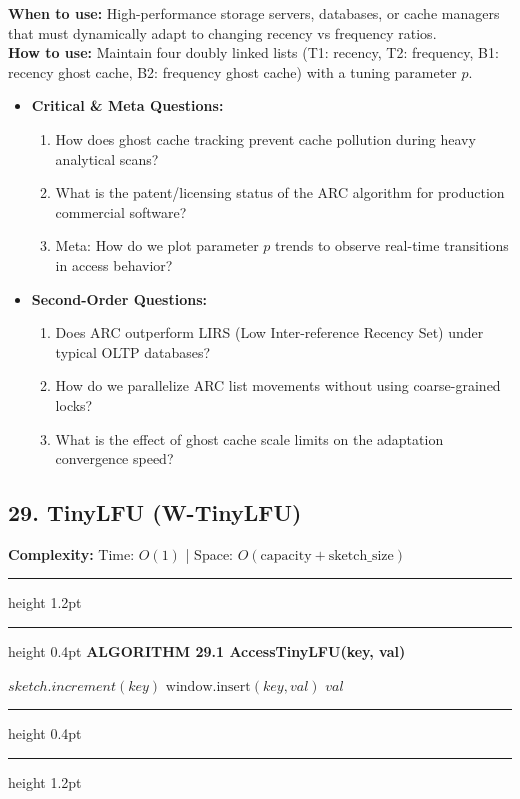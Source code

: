 \documentclass[11pt,a4paper]{article}
\newenvironment{textbookalgo}[2]{%
  \par\addvspace{1.2em}\noindent
  \hrule height 1.2pt
  \vspace{1.5pt}
  \hrule height 0.4pt
  \vspace{5pt}
  {\noindent\large\bfseries\sffamily ALGORITHM #1 \quad #2}
  \par\vspace{5pt}
  \RestyleAlgo{plain}
}{%
  \par\vspace{4pt}
  \hrule height 0.4pt
  \vspace{1.5pt}
  \hrule height 1.2pt
  \par\addvspace{1.2em}
}
\theoremstyle{definition}
\begin{document}
\noindent
\textbf{When to use:} High-performance storage servers, databases, or cache managers that must dynamically adapt to changing recency vs frequency ratios.\\
\textbf{How to use:} Maintain four doubly linked lists (T1: recency, T2: frequency, B1: recency ghost cache, B2: frequency ghost cache) with a tuning parameter $p$.
\begin{itemize}[leftmargin=*]
  \item[] \textbf{Critical \& Meta Questions:}
  \begin{enumerate}
    \item How does ghost cache tracking prevent cache pollution during heavy analytical scans?
    \item What is the patent/licensing status of the ARC algorithm for production commercial software?
    \item Meta: How do we plot parameter $p$ trends to observe real-time transitions in access behavior?
  \end{enumerate}
  \item[] \textbf{Second-Order Questions:}
  \begin{enumerate}
    \item Does ARC outperform LIRS (Low Inter-reference Recency Set) under typical OLTP databases?
    \item How do we parallelize ARC list movements without using coarse-grained locks?
    \item What is the effect of ghost cache scale limits on the adaptation convergence speed?
  \end{enumerate}
\end{itemize}
\medskip


\clearpage
\subsection{29. TinyLFU (W-TinyLFU)}

\noindent
\textbf{Complexity:} Time: $O(1)$ | Space: $O(\text{capacity} + \text{sketch\_size})$
\smallskip

\begin{textbookalgo}{29.1}{AccessTinyLFU(key, val)}
\begin{algorithm}[H]
$sketch.increment(key)$\;
$\text{window.insert}(key, val)$\;
\Return $val$\;
\end{algorithm}
\end{textbookalgo}
\end{document}
